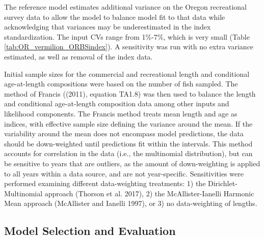 \documentclass[11pt,
  english,
  a4paper,
]{article}
\begin{document}
The reference model estimates additional variance on the Oregon recreational survey data to allow the model to balance model fit to that data while acknowledging that variances may be underestimated in the index standardization. The input CVs range from 1\%-7\%, which is very small (Table \ref{tab:OR_vermilion_ORBSindex}). A sensitivity was run with no extra variance estimated, as well as removal of the index data.

\leavevmode\tagmcend\tagstructend\par


Initial sample sizes for the commercial and recreational length and conditional age-at-length compositions were based on the number of fish sampled. The method of Francis ({(2011)\leavevmode\tagmcend\tagstructend}, equation TA1.8) was then used to balance the length and conditional age-at-length composition data among other inputs and likelihood components. The Francis method treats mean length and age as indices, with effective sample size defining the variance around the mean. If the variability around the mean does not encompass model predictions, the data should be down-weighted until predictions fit within the intervals. This method accounts for correlation in the data (i.e., the multinomial distribution), but can be sensitive to years that are outliers, as the amount of down-weighting is applied to all years within a data source, and are not year-specific. Sensitivities were performed examining different data-weighting treatments: 1) the Dirichlet-Multinomial approach {(Thorson et al. 2017)\leavevmode\tagmcend\tagstructend}, 2) the McAllister-Ianelli Harmonic Mean approach {(McAllister and Ianelli 1997)\leavevmode\tagmcend\tagstructend}, or 3) no data-weighting of lengths.

\leavevmode\tagmcend\tagstructend\par


\hypertarget{model-selection-and-evaluation}{%
\subsection{Model Selection and Evaluation}\label{model-selection-and-evaluation}}
\end{document}
